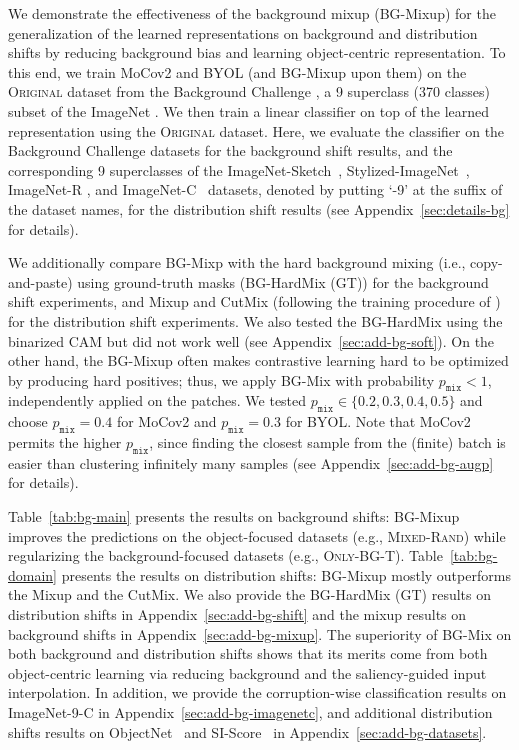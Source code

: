 \documentclass{article}
\begin{document}


We demonstrate the effectiveness of the background mixup (BG-Mixup) for the generalization of the learned representations on background and distribution shifts by reducing background bias and learning object-centric representation. To this end, we train MoCov2 and BYOL (and BG-Mixup upon them) on the \textsc{Original} dataset from the Background Challenge \citep{xiao2021noise}, a 9 superclass (370 classes) subset of the ImageNet \citep{deng2009imagenet}. We then train a linear classifier on top of the learned representation using the \textsc{Original} dataset. Here, we evaluate the classifier on the Background Challenge datasets for the background shift results, and the corresponding 9 superclasses of the ImageNet-Sketch~\citep{wang2019learning}, Stylized-ImageNet~\citep{geirhos2019imagenet}, ImageNet-R \citep{hendrycks2020many}, and ImageNet-C~\citep{hendrycks2019robustness} datasets, denoted by putting `-9' at the suffix of the dataset names, for the distribution shift results (see Appendix~\ref{sec:details-bg} for details).

We additionally compare BG-Mixp with the hard background mixing (i.e., copy-and-paste) using ground-truth masks (BG-HardMix (GT)) for the background shift experiments, and Mixup \citep{zhang2018mixup} and CutMix \citep{yun2019cutmix} (following the training procedure of \citep{lee2021mix}) for the distribution shift experiments. We also tested the BG-HardMix using the binarized CAM but did not work well (see Appendix~\ref{sec:add-bg-soft}). On the other hand, the BG-Mixup often makes contrastive learning hard to be optimized by producing hard positives; thus, we apply BG-Mix with probability $p_\texttt{mix} < 1$, independently applied on the patches. We tested $p_\texttt{mix} \in \{0.2,0.3,0.4,0.5\}$ and choose $p_\texttt{mix} = 0.4$ for MoCov2 and $p_\texttt{mix} = 0.3$ for BYOL. Note that MoCov2 permits the higher $p_\texttt{mix}$, since finding the closest sample from the (finite) batch is easier than clustering infinitely many samples (see Appendix~\ref{sec:add-bg-augp} for details).

Table~\ref{tab:bg-main} presents the results on background shifts: BG-Mixup improves the predictions on the object-focused datasets (e.g., \textsc{Mixed-Rand}) while regularizing the background-focused datasets (e.g., \textsc{Only-BG-T}). Table~\ref{tab:bg-domain} presents the results on distribution shifts: BG-Mixup mostly outperforms the Mixup and the CutMix. We also provide the BG-HardMix (GT) results on distribution shifts in Appendix~\ref{sec:add-bg-shift} and the mixup results on background shifts in Appendix~\ref{sec:add-bg-mixup}. The superiority of BG-Mix on both background and distribution shifts shows that its merits come from both object-centric learning via reducing background and the saliency-guided input interpolation. In addition, we provide the corruption-wise classification results on ImageNet-9-C in Appendix~\ref{sec:add-bg-imagenetc}, and additional distribution shifts results on ObjectNet~\citep{barbu2019objectnet} and SI-Score~\citep{djolonga2021robustness} in Appendix~\ref{sec:add-bg-datasets}.
\end{document}
